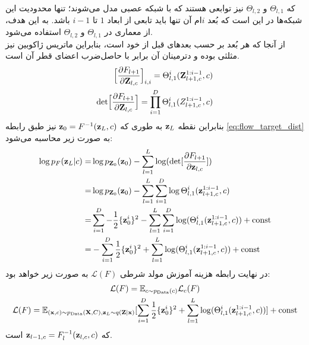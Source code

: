 که $\Theta_{l,1}$ و $\Theta_{l,2}$ نیز توابعی هستند که با شبکه عصبی مدل می‌شوند؛ تنها محدودیت این شبکه‌ها در این است که بُعد $i$ام آن تنها باید تابعی از ابعاد $1$ تا $i-1$ باشد. به این هدف، از معماری  در $\Theta_{l,1}$ و $\Theta_{l,2}$ استفاده می‌شود.
\\
از آنجا که هر بُعد بر حسب بعدهای قبل از خود است، بنابراین ماتریس ژاکوبین نیز مثلثی بوده و دترمینان آن برابر با حاصل‌ضرب اعضای قطر آن است.
\begin{align}
	\Big[ \frac{\partial F_{l+1}}{\partial {\bf Z}_{l,c}} \Big]_{i,i} = \Theta^{i}_{l,1}({\bf Z}^{1:i-1}_{l+1,c}, c) \nonumber
	\\
	\text{det}\Big[ \frac{\partial F_{l+1}}{\partial{\bf Z}_{l,c}} \Big] = \prod_{i=1}^D \Theta^{i}_{l,1}(Z^{1:i-1}_{l+1, c}, c)
\end{align}
بنابراین \likelihood{} نقطه ${\bf z}_L$ به طوری که 
${\bf z}_0 = F^{-1}({\bf z}_L, c)$
 نیز طبق رابطه \ref{eq:flow_target_dist} به صورت زیر محاسبه می‌شود:
\begin{align}
	\log p_F({\bf z}_L|c) = & \log p_{{\bf Z}_0}({\bf z}_0) - \sum_{l=1}^L \log (\text{det}[    \frac{\partial F_{l+1}}{\partial {\bf z}_{l,c}}     ]) \nonumber
	\\
	=               & \log p_{{\bf Z}_0}({\bf z}_0) - \sum_{l=1}^L \sum_{i=1}^D \log \Theta^{i}_{l,1}({\bf z}^{1:i-1}_{l+1, c}, c) \nonumber
	\\
	=               & \sum_{i=1}^D -\frac{1}{2} \{{\bf z}^i_0\}^2 - \sum_{l=1}^L \sum_{i=1}^D \log (\Theta^{i}_{l,1}({\bf z}^{1:i-1}_{l+1,c}, c)) + \text{const} \nonumber
	\\
	=               & -\sum_{i=1}^D \frac{1}{2} \{{\bf z}^i_0\}^2 + \sum_{l=1}^L \log (\Theta^{i}_{l,1}({\bf z}^{1:i-1}_{l+1,c}, c)) + \text{const}
\end{align}
در نهایت رابطه هزینه آموزش مولد شرطی $\mathcal{L} (F)$ به صورت زیر خواهد بود:
\begin{gather}
    \mathcal{L} (F) = \mathbb E_{c \sim p_\text{Data}(c)} \mathcal{L}_c (F) \nonumber 
    \\
    \mathcal{L} (F) = \mathbb E_{({\bf x},c) \sim p_\text{Data}({\bf X},C), {\bf z}_L \sim q({\bf Z}|{\bf x})} [\sum_{i=1}^D \frac{1}{2} \{{\bf z}^i_0\}^2 + \sum_{l=1}^L \log (\Theta^{i}_{l,1}({\bf z}^{1:i-1}_{l+1, c}, c))] + \text{const}
\end{gather}
که 
${\bf z}_{l-1,c} = F^{-1}_{l}({\bf z}_{l,c},c)$ است.

